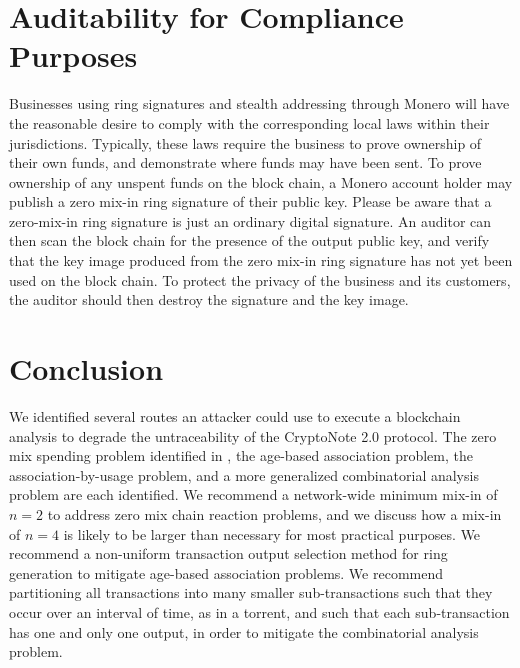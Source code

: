 \documentclass[12pt,english]{mrl}
\theoremstyle{definition}
\numberwithin{equation}{section}
\numberwithin{figure}{section}
\numberwithin{equation}{section}
\numberwithin{equation}{section}
\numberwithin{figure}{section}
\begin{document}

\section{Auditability for Compliance Purposes}\label{auditability}

Businesses using ring signatures and stealth addressing through Monero will have the reasonable desire to comply with the corresponding local laws within their jurisdictions. Typically, these laws require the business to prove ownership of their own funds, and demonstrate where funds may have been sent. To prove ownership of any unspent funds on the block chain, a Monero account holder may publish a zero mix-in ring signature of their public key. Please be aware that a zero-mix-in ring signature is just an ordinary digital signature. An auditor can then scan the block chain for the presence of the output public key, and verify that the key image produced from the zero mix-in ring signature has not yet been used on the block chain. To protect the privacy of the business and its customers, the auditor should then destroy the signature and the key image.

\section{Conclusion}\label{conclusion}

We identified several routes an attacker could use to execute a blockchain analysis to degrade the untraceability of the CryptoNote 2.0 protocol. The zero mix spending problem identified in \cite{chainReactions}, the age-based association problem, the association-by-usage problem, and a more generalized combinatorial analysis problem are each identified. We recommend a network-wide minimum mix-in of $n=2$ to address zero mix chain reaction problems, and we discuss how a mix-in of $n=4$ is likely to be larger than necessary for most practical purposes. We recommend a non-uniform transaction output selection method for ring generation to mitigate age-based association problems. We recommend partitioning all transactions into many smaller sub-transactions such that they occur over an interval of time, as in a torrent, and such that each sub-transaction has one and only one output, in order to mitigate the combinatorial analysis problem.





\medskip{}



\end{document}
